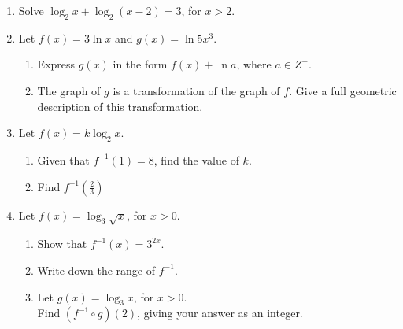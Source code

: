 \documentclass[12pt, oneside]{article}
\begin{document}
\begin{enumerate}
\item Solve $\log_2 x + \log_2 (x-2) = 3$, for $x>2$.
    \begin{flushright}[7]\end{flushright}

\item Let $f(x)= 3 \ln x$ and $g(x)= \ln 5x^3$.
\begin{enumerate}
    \item Express $g(x)$ in the form $f(x)+ \ln a$, where $a \in Z^+$.
        \begin{flushright}[4]\end{flushright}
    \item The graph of $g$ is a transformation of the graph of $f$. Give a full geometric description of this transformation.
        \begin{flushright}[3]\end{flushright}
\end{enumerate}

\item Let $f(x)= k \log_2 x$.
\begin{enumerate}
    \item Given that $f^{-1}(1) = 8$, find the value of $k$.
        \begin{flushright}[3]\end{flushright}
    \item Find $f^{-1}(\frac{2}{3})$
        \begin{flushright}[4]\end{flushright}
\end{enumerate}

\item Let $f(x)= \log_3 \sqrt{x}$, for $x>0$.
\begin{enumerate}
    \item Show that $f^{-1}(x) = 3^{2x}$.
        \begin{flushright}[2]\end{flushright}
    \item Write down the range of $f^{-1}$.
        \begin{flushright}[1]\end{flushright}
    \item Let $g(x)= \log_3 x$, for $x>0$.\\
        Find $\left( f^{-1} \circ g \right) (2)$, giving your answer as an integer.
        \begin{flushright}[4]\end{flushright}
\end{enumerate}


\end{enumerate}
\end{document}
